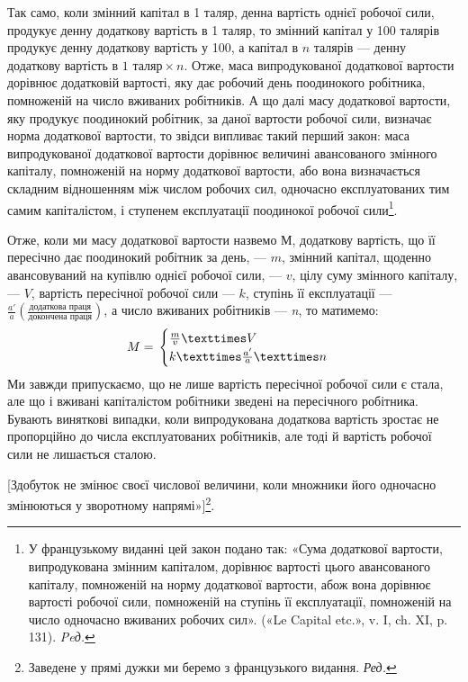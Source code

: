Так само, коли змінний капітал в 1 таляр, денна вартість однієї
робочої сили, продукує денну додаткову вартість в 1 таляр, то
змінний капітал у 100 талярів продукує денну додаткову вартість
у 100, а капітал в $n$ талярів — денну додаткову вартість в $1\text{ таляр} × n$.
Отже, маса випродукованої додаткової вартости дорівнює додатковій
вартості, яку дає робочий день поодинокого робітника,
помноженій на число вживаних робітників. А що далі масу додаткової
вартости, яку продукує поодинокий робітник, за даної вартости
робочої сили, визначає норма додаткової вартости, то звідси
випливає такий перший закон: маса випродукованої додаткової
вартости дорівнює величині авансованого змінного капіталу, помноженій
на норму додаткової вартости, або вона визначається
складним відношенням між числом робочих сил, одночасно експлуатованих
тим самим капіталістом, і ступенем експлуатації
поодинокої робочої сили\footnote*{
У французькому виданні цей закон подано так: «Сума додаткової
вартости, випродукована змінним капіталом, дорівнює вартості цього
авансованого капіталу, помноженій на норму додаткової вартости, абож
вона дорівнює вартості робочої сили, помноженій на ступінь її експлуатації,
помноженій на число одночасно вживаних робочих сил». («Le Capital
etc.», v. I, ch. XI, p. 131). \emph{Peд.}
}.

Отже, коли ми масу додаткової вартости назвемо $М$, додаткову
вартість, що її пересічно дає поодинокий робітник за день, — $m$,
змінний капітал, щоденно авансовуваний на купівлю однієї робочої
сили, — $v$, цілу суму змінного капіталу, — $V$, вартість пересічної
робочої сили — $k$, ступінь її експлуатації —
$\frac{a'}{a}\left(\frac{\text{додаткова праця}}{\text{докончена праця}}\right)$,
а число вживаних робітників — \emph{n}, то матимемо: \[
M \deq{}
\begin{cases}
\frac{m}{v} × V & \\
k × \frac{a'}{a} × n & \\
\end{cases}
\]
\noindent{}Ми завжди припускаємо, що не лише вартість пересічної робочої
сили є стала, але що і вживані капіталістом робітники зведені
на пересічного робітника. Бувають виняткові випадки, коли
випродукована додаткова вартість зростає не пропорційно до числа
експлуатованих робітників, але тоді й вартість робочої сили не
лишається сталою.

[Здобуток не змінює своєї числової величини, коли множники
його одночасно змінюються у зворотному напрямі»]\footnote*{
Заведене у прямі дужки ми беремо з французького видання. \emph{Ред.}
}.

